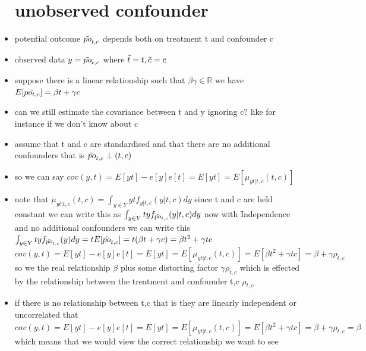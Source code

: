 \documentclass{article}
\begin{document}
\begin{itemize}
\section{unobserved confounder}
\item potential outcome $\Tilde{po}_{t,c}$ depends both on treatment t and confounder c 
\item observed data $y=\Tilde{po}_{t,c}$ where $\Tilde{t}=t,\Tilde{c}=c$
\item suppose there is a linear relationship such that $\beta \gamma \in \mathbb{R}$ we have $E[\Tilde{po_{t,c}}]=\beta t+ \gamma c$
\item can we still estimate the covariance between t and y ignoring c? like for instance if we don't know about c 
\item assume that t and c are standardised and that there are no additional confounders that is $\Tilde{po}_{t,c}\perp (t,c)$
\item so we can say $cov(y,t)=E[yt]-e[y]e[t]=E[yt]=E[\mu_{yt|t,c}(t,c)]$
\item note that $\mu_{yt|t,c}(t,c)=\int_{y\in Y}ytf_{y|t,c}(y|t,c)dy$ since t and c are held constant we can write this as $\int_{y\in Y}tyf_{\Tilde{po}_{t,c}}(y|t,c)dy$ now with Independence and no additional confounders we can write this $\int_{y\in Y}tyf_{\Tilde{po}_{t,c}}(y)dy=tE[\Tilde{po}_{t,c}]=t(\beta t+\gamma c)=\beta t^2+\gamma tc $
$cov(y,t)=E[yt]-e[y]e[t]=E[yt]=E[\mu_{yt|t,c}(t,c)]=E[\beta t^2+\gamma tc]=\beta +\gamma \rho_{t,c}$ so we the real relationship $\beta $ plus some distorting factor $\gamma\rho_{t,c}$ which is effected by the relationship between the treatment and confounder t,c $\rho_{t,c}$
\item if there is no relationship between t,c that is they are linearly independent or uncorrelated that $cov(y,t)=E[yt]-e[y]e[t]=E[yt]=E[\mu_{yt|t,c}(t,c)]=E[\beta t^2+\gamma tc]=\beta +\gamma \rho_{t,c}=\beta$ which means that we would view the correct relationship we want to see 

\end{itemize}
\end{document}
